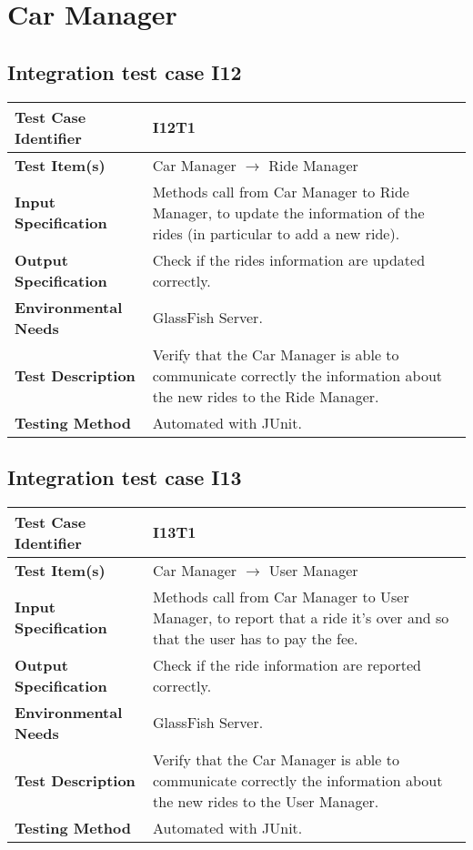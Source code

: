 \section{Car Manager}
\subsection{Integration test case I12}
\begin{tabular}{l p{}}
    \hline
    \textbf{Test Case Identifier} & I12T1\\
    \hline
    \textbf{Test Item(s)} & Car Manager $\rightarrow$ Ride Manager\\
    \hline
    \textbf{Input Specification} & Methods call from Car Manager to Ride Manager, to update the information of the rides (in particular to add a new ride).\\
    \hline
    \textbf{Output Specification} & Check if the rides information are updated correctly.\\
    \hline
    \textbf{Environmental Needs} & GlassFish Server.\\
    \hline
    \textbf{Test Description} & Verify that the Car Manager is able to communicate correctly the information about the new rides to the Ride Manager.\\
    \hline
    \textbf{Testing Method} & Automated with JUnit.\\
    \hline
\end{tabular}

\subsection{Integration test case I13}

\begin{tabular}{l p{}}
    \hline
    \textbf{Test Case Identifier} & I13T1\\
    \hline
    \textbf{Test Item(s)} & Car Manager $\rightarrow$ User Manager\\
    \hline
    \textbf{Input Specification} & Methods call from Car Manager to User Manager, to report that a ride it's over and so that the user has to pay the fee.\\
    \hline
    \textbf{Output Specification} & Check if the ride information are reported correctly.\\
    \hline
    \textbf{Environmental Needs} & GlassFish Server.\\
    \hline
    \textbf{Test Description} & Verify that the Car Manager is able to communicate correctly the information about the new rides to the User Manager.\\
    \hline
    \textbf{Testing Method} & Automated with JUnit.\\
    \hline
\end{tabular}